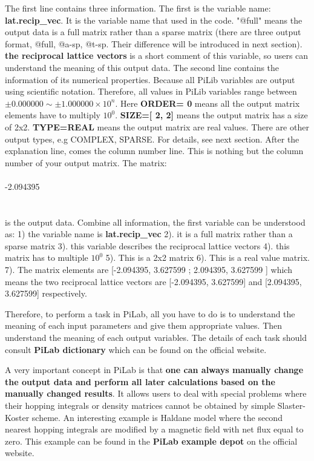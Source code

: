 \documentclass[10pt,a4paper]{article}
\begin{document}
The first line contains three information. The first is the variable name: \textbf{lat.recip\_vec}. It is the variable name that used in the code. "@full" means the output data is a full matrix rather than a sparse matrix (there are three output format, @full, @a-sp, @t-sp. Their difference will be introduced in next section). \textbf{the reciprocal lattice vectors} is a short comment of this variable, so users can understand the meaning of this output data. The second line contains the information of its numerical properties. Because all PiLib variables are output using scientific notation. Therefore, all values in PiLib variables range between $\pm 0.000000 \sim \pm 1.000000 \times 10^{n}$. Here \textbf{ORDER=    0} means all the output matrix elements have to multiply $10^{0}$. \textbf{SIZE=[    2,    2]} means the output matrix has a size of 2x2. \textbf{TYPE=REAL} means the output matrix are real values. There are other output types, e.g COMPLEX, SPARSE. For details, see next section. After the explanation line, comes the column number line. This is nothing but the column number of your output matrix. The matrix:\\ \\
-2.094395  \\
  \\ \\
is the output data. Combine all information, the first variable can be understood as: 1) the variable name is \textbf{lat.recip\_vec} 2). it is a full matrix rather than a sparse matrix 3). this variable describes the reciprocal lattice vectors 4). this matrix has to multiple $10^{0}$ 5). This is a 2x2 matrix 6). This is a real value matrix. 7). The matrix elements are [-2.094395, 3.627599 ; 2.094395, 3.627599 ] which means the two reciprocal lattice vectors are [-2.094395, 3.627599] and [2.094395, 3.627599] respectively. 

Therefore, to perform a task in PiLab, all you have to do is to understand the meaning of each input parameters and give them appropriate values. Then understand the meaning of each output variables. The details of each task should consult \textbf{PiLab dictionary} which can be found on the official website.  

A very important concept in PiLab is that \textbf{one can always manually change the output data and perform all later calculations based on the manually changed results}. It allows users to deal with special problems where their hopping integrals or density matrices cannot be obtained by simple Slaster-Koster scheme. An interesting example is Haldane model where the second nearest hopping integrals are modified by a magnetic field with net flux equal to zero. This example can be found in the \textbf{PiLab example depot} on the official website. 
\end{document}
